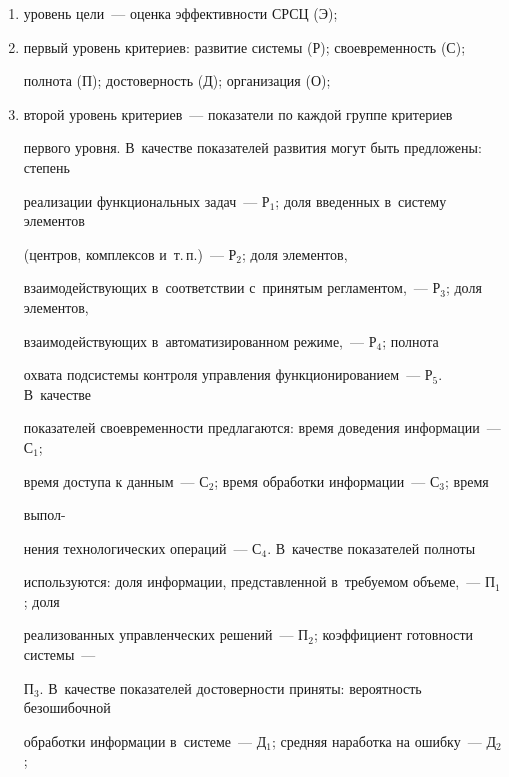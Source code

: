       \begin{enumerate}[(1)]

      \item уровень цели~--- оценка эффективности СРСЦ (Э);\\[-15pt] 

      \item первый уровень критериев: развитие системы (Р); своевременность (С); 

полнота (П); достоверность (Д); организация (О);\\[-15pt]

      \item второй уровень критериев~--- показатели по каждой группе критериев 

первого уровня. В~качестве показателей развития могут быть предложены: степень 

реализации функциональных задач~--- Р$_1$; доля введенных в~систему элементов 

(центров, комплексов и~т.\,п.)~--- Р$_2$; доля элементов,  

взаимодействующих в~соответствии с~принятым регламентом,~--- Р$_3$; доля элементов, 

 взаимодействующих в~автоматизированном режиме,~--- Р$_4$; полнота 

охвата подсистемы контроля управления функционированием~--- Р$_5$. В~качестве 

показателей своевременности предлагаются: время доведения информации~--- С$_1$; 

время доступа к данным~--- С$_2$; время обработки информации~--- С$_3$; время 

выпол-\linebreak\vspace*{-12pt}



\pagebreak



\noindent

нения технологических операций~--- С$_4$. В~качестве показателей полноты 

используются: доля информации, представленной в~требуемом объеме,~--- П$_1$; доля 

реализованных управленческих решений~--- П$_2$; коэффициент готовности системы~--- 

П$_3$. В~качестве показателей достоверности приняты: вероятность безошибочной 

обработки информации в~системе~--- Д$_1$; средняя наработка на ошибку~--- Д$_2$; 


\end{enumerate}
